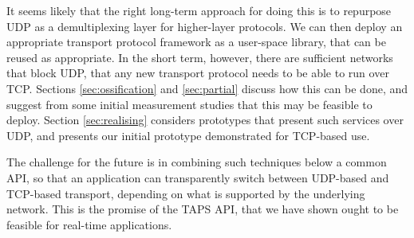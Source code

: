 \documentclass[10pt]{sig-alternate-05-2015}
\begin{document}
It seems likely that the right long-term approach for doing this is to
repurpose UDP as a demultiplexing layer for higher-layer protocols. We can
then deploy an appropriate transport protocol framework as a user-space
library, that can be reused as appropriate. In the short term, however, 
there are sufficient networks that block UDP, that any new transport
protocol needs to be able to run over TCP. Sections \ref{sec:ossification}
and \ref{sec:partial} discuss how this can be done, and suggest from some
initial measurement studies that this may be feasible to deploy. Section
\ref{sec:realising} considers prototypes that present such services over
UDP, and presents our initial prototype demonstrated for TCP-based use.

The challenge for the future is in combining such techniques below a common
API, so that an application can transparently switch between UDP-based and
TCP-based transport, depending on what is supported by the underlying
network. This is the promise of the TAPS API, that we have shown ought to
be feasible for real-time applications.


%
%


\end{document}
